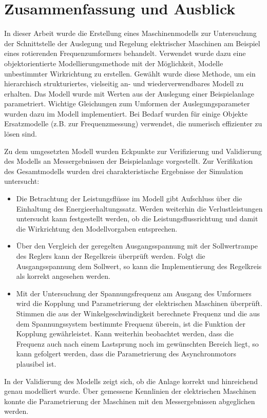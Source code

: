 \chapter{Zusammenfassung und Ausblick}
\label{chap:ZusammenfassungAusblick}
In dieser Arbeit wurde die Erstellung eines Maschinenmodells zur Untersuchung der Schnittstelle der Auslegung und Regelung elektrischer Maschinen am Beispiel eines rotierenden Frequenzumformers behandelt. Verwendet wurde dazu eine objektorientierte Modellierungsmethode mit der Möglichkeit, Modelle unbestimmter Wirkrichtung zu erstellen. Gewählt wurde diese Methode, um ein hierarchisch strukturiertes, vielseitig an- und wiederverwendbares Modell zu erhalten. Das Modell wurde mit Werten aus der Auslegung einer Beispielanlage parametriert. Wichtige Gleichungen zum Umformen der Auslegungsparameter wurden dazu im Modell implementiert. Bei Bedarf wurden für einige Objekte Ersatzmodelle (z.B. zur Frequenzmessung) verwendet, die numerisch effizienter zu lösen sind.

Zu dem umgesetzten Modell wurden Eckpunkte zur Verifizierung und Validierung des Modells an Messergebnissen der Beispielanlage vorgestellt. Zur Verifikation des Gesamtmodells wurden drei charakteristische Ergebnisse der Simulation untersucht:
\begin{itemize}
	\item Die Betrachtung der Leistungsflüsse im Modell gibt Aufschluss über die Einhaltung des Energieerhaltungssatz. Werden weiterhin die Verlustleistungen untersucht kann festgestellt werden, ob die Leistungsflussrichtung und damit die Wirkrichtung den Modellvorgaben entsprechen.
	\item Über den Vergleich der geregelten Ausgangsspannung mit der Sollwertrampe des Reglers kann der Regelkreis überprüft werden. Folgt die Ausgangsspannung dem Sollwert, so kann die Implementierung des Regelkreis als korrekt angesehen werden.
	\item Mit der Untersuchung der Spannungsfrequenz am Ausgang des Umformers wird die Kopplung und Parametrierung der elektrischen Maschinen überprüft. Stimmen die aus der Winkelgeschwindigkeit berechnete Frequenz und die aus dem Spannungssystem bestimmte Frequenz überein, ist die Funktion der Kopplung gewährleistet. Kann weiterhin beobachtet werden, dass die Frequenz auch nach einem Lastsprung noch im gewünschten Bereich liegt, so kann gefolgert werden, dass die Parametrierung des Asynchronmotors plausibel ist.
\end{itemize}
In der Validierung des Modells zeigt sich, ob die Anlage korrekt und hinreichend genau modelliert wurde. Über gemessene Kennlinien der elektrischen Maschinen konnte die Parametrierung der Maschinen mit den Messergebnissen abgeglichen werden.

